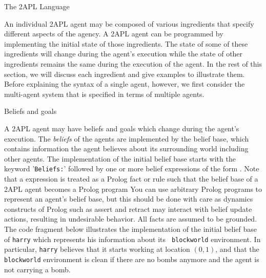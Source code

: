 \begin{chapter}{The 2APL Language}



An individual 2APL agent may be composed of various ingredients that
specify different aspects of the agency. A 2APL agent can be
programmed by implementing the initial state of those ingredients.
The state of some of these ingredients will change during the
agent's execution while the state of other ingredients remains the
same during the execution of the agent. In the rest of this section,
we will discuss each ingredient and give examples to illustrate
them. Before explaining the syntax of a single agent, however, we
first consider the multi-agent system that is specified in terms of
multiple agents.


\begin{section}{Beliefs and goals}

A 2APL agent may have beliefs and goals which change during the
agent's execution. The \emph{beliefs} of the agents are implemented
by the belief base, which contains information the agent believes
about its surrounding world including other agents. The
implementation of the initial belief base starts with the keyword
'{\tt Beliefs:}' followed by one or more belief expressions of the
form . Note that a  expression is treated as
a Prolog fact or rule such that the belief base of a 2APL agent
becomes a Prolog program You can use arbitrary Prolog programs to
represent an agent's belief base, but this should be done with care
as dynamics constructs of Prolog such as assert and retract may
interact with belief update actions, resulting in undesirable
behavior. All facts are assumed to be grounded. The code fragment
below illustrates the implementation of the initial belief base of
{\tt harry} which represents his information about its {\tt
blockworld} environment. In particular, {\tt harry} believes that it
starts working at location $(0,1)$, and that the {\tt blockworld}
environment is clean if there are no bombs anymore and the agent is
not carrying a bomb.


\end{section}
\end{chapter}
